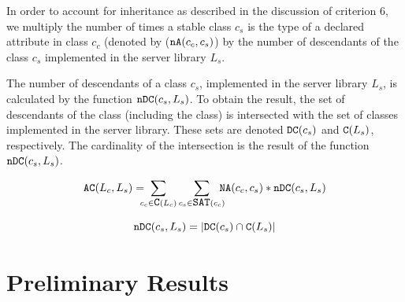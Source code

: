 \documentclass[a4paper]{article}
\begin{document}

In order to account for inheritance as described in the discussion of criterion 6, we multiply the number of times a stable class $c_s$ is the type of a declared attribute in class $c_c$ (denoted by ($\verb|nA|(c_c, c_s)$) by the number of descendants of the class $c_s$ implemented in the server library $L_s$.

The number of descendants of a class $c_s$, implemented in the server library $L_s$, is calculated by the function $\verb|nDC|(c_s, L_s)$. To obtain the result, the set of descendants of the class (including the class) is intersected with the set of classes implemented in the server library. These sets are denoted $\verb|DC|(c_s)$ and $\verb|C|(L_s)$, respectively. The cardinality of the intersection is the result of the function $\verb|nDC|(c_s, L_s)$.


\begin{equation*}
  \verb|AC|(L_c,L_s) = \!\!\!\!\sum_{c_c \in \verb|C|(L_c)} \sum_{c_s \in \verb|SAT|(c_c)} \!\!\!\!\verb|NA|(c_c, c_s)*\verb|nDC|(c_s, L_s)
\end{equation*}

\begin{equation*}
    \verb|nDC|(c_s, L_s) = |\verb|DC|(c_s) \cap \verb|C|(L_s)|
\end{equation*}

\section{Preliminary Results}
\end{document}
